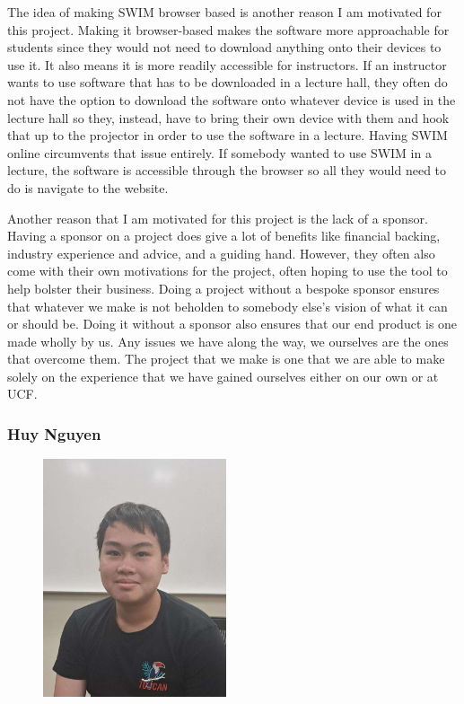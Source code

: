 \documentclass[
    paper=letter,
    parskip=half,
    fontsize=12pt,
    titlepage=firstiscover,
    toc=bibliography,
    numbers=endperiod
]{scrartcl}
\begin{document}
The idea of making SWIM browser based is another reason I am motivated for this project. Making it browser-based makes the software more approachable for students since they would not need to download anything onto their devices to use it. It also means it is more readily accessible for instructors. If an instructor wants to use software that has to be downloaded in a lecture hall, they often do not have the option to download the software onto whatever device is used in the lecture hall so they, instead, have to bring their own device with them and hook that up to the projector in order to use the software in a lecture. Having SWIM online circumvents that issue entirely. If somebody wanted to use SWIM in a lecture, the software is accessible through the browser so all they would need to do is navigate to the website.

Another reason that I am motivated for this project is the lack of a sponsor. Having a sponsor on a project does give a lot of benefits like financial backing, industry experience and advice, and a guiding hand. However, they often also come with their own motivations for the project, often hoping to use the tool to help bolster their business. Doing a project without a bespoke sponsor ensures that whatever we make is not beholden to somebody else's vision of what it can or should be. Doing it without a sponsor also ensures that our end product is one made wholly by us. Any issues we have along the way, we ourselves are the ones that overcome them. The project that we make is one that we are able to make solely on the experience that we have gained ourselves either on our own or at UCF.



\subsubsection{Huy Nguyen}
\begin{figure}[H]
    \includegraphics[height=7cm]{profile-huy}
\end{figure}
\end{document}

